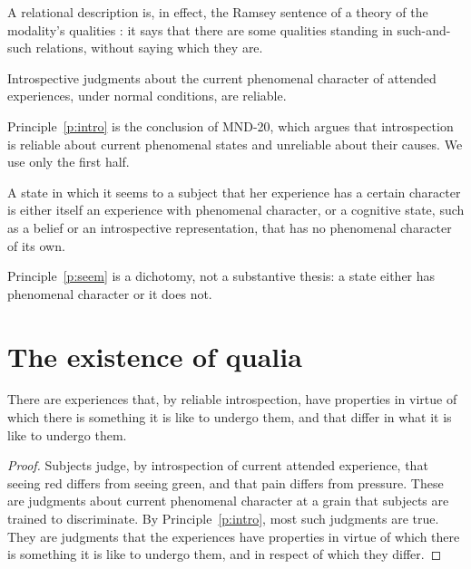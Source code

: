 \documentclass{situationist-preprint}
\begin{document}
A relational description is, in effect, the Ramsey sentence of a theory of the modality's qualities \citep{Lewis1970}: it says that there are some qualities standing in such-and-such relations, without saying which they are.

\begin{principle}\label{p:intro}
Introspective judgments about the current phenomenal character of attended experiences, under normal conditions, are reliable.
\end{principle}

Principle~\ref{p:intro} is the conclusion of MND-20, which argues that introspection is reliable about current phenomenal states and unreliable about their causes. We use only the first half.

\begin{principle}\label{p:seem}
A state in which it seems to a subject that her experience has a certain character is either itself an experience with phenomenal character, or a cognitive state, such as a belief or an introspective representation, that has no phenomenal character of its own.
\end{principle}

Principle~\ref{p:seem} is a dichotomy, not a substantive thesis: a state either has phenomenal character or it does not.

\section{The existence of qualia}

\begin{lemma}\label{l:datum}
There are experiences that, by reliable introspection, have properties in virtue of which there is something it is like to undergo them, and that differ in what it is like to undergo them.
\end{lemma}

\begin{proof}
Subjects judge, by introspection of current attended experience, that seeing red differs from seeing green, and that pain differs from pressure. These are judgments about current phenomenal character at a grain that subjects are trained to discriminate. By Principle~\ref{p:intro}, most such judgments are true. They are judgments that the experiences have properties in virtue of which there is something it is like to undergo them, and in respect of which they differ.
\end{proof}
\end{document}
